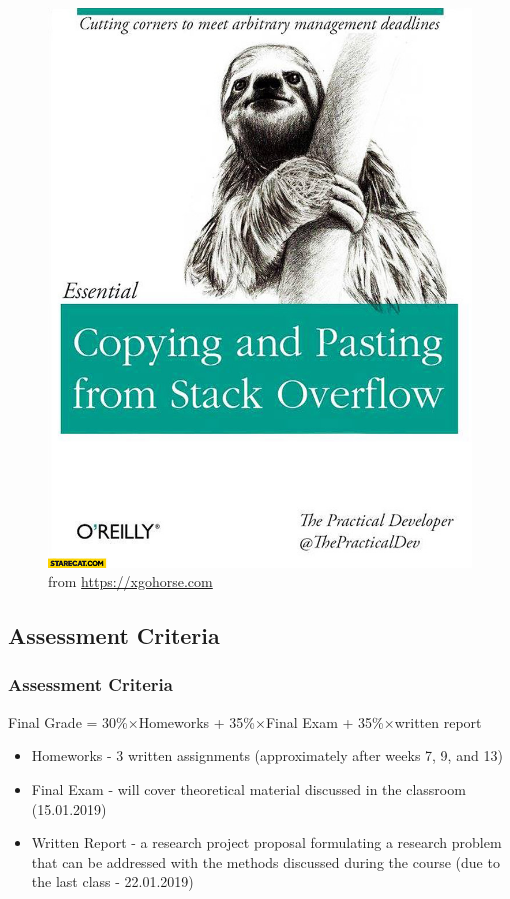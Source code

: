 \begin{frame}
\begin{overprint}
\begin{figure}
                \includegraphics[scale = .175]{png/copy_paste.png}
                \caption{from \textcolor{blue}{\href{https://xgohorse.com}{https://xgohorse.com}}}
            \end{figure}
    \end{overprint}
\end{frame}

\subsection[Assessment]{Assessment Criteria}
\begin{frame}
    \frametitle{Assessment Criteria}
    \begin{block}{}
        Final Grade = 30\%$\times$Homeworks + 35\%$\times$Final Exam + 35\%$\times$written report\\
    \end{block}
        \begin{itemize}
        \item Homeworks - 3 written assignments (approximately after weeks 7, 9, and 13)
        \item Final Exam - will cover theoretical material discussed in the classroom (15.01.2019)
        \item Written Report - a research project proposal formulating a research problem that can be addressed with the methods discussed during the course (due to the last class - 22.01.2019)
    \end{itemize}
\end{frame}

